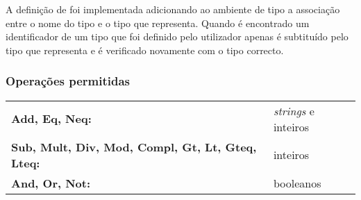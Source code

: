 A definição de foi implementada adicionando ao ambiente de tipo a associação 
entre o nome do tipo e o tipo que representa. Quando é encontrado um 
identificador de um tipo que foi definido pelo utilizador apenas é subtituído 
pelo tipo que representa e é verificado novamente com o tipo correcto.

\subsubsection{Operações permitidas}
{
\ttfamily
\begin{tabular}{ll}
\textbf{Add, Eq, Neq:}										&\emph{strings} e 
																		inteiros
\\
\textbf{Sub, Mult, Div, Mod, Compl, Gt, Lt, Gteq, Lteq:}	&inteiros
\\
\textbf{And, Or, Not:}										&booleanos
\end{tabular}
}
